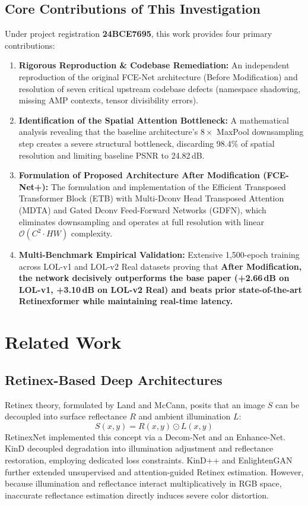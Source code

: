 \documentclass[10pt,twocolumn,letterpaper]{article}
\begin{document}
\subsection{Core Contributions of This Investigation}
Under project registration \textbf{24BCE7695}, this work provides four primary contributions:
\begin{enumerate}
    \item \textbf{Rigorous Reproduction \& Codebase Remediation:} An independent reproduction of the original FCE-Net architecture (Before Modification) and resolution of seven critical upstream codebase defects (namespace shadowing, missing AMP contexts, tensor divisibility errors).
    \item \textbf{Identification of the Spatial Attention Bottleneck:} A mathematical analysis revealing that the baseline architecture's $8\times$ MaxPool downsampling step creates a severe structural bottleneck, discarding 98.4\% of spatial resolution and limiting baseline PSNR to 24.82\,dB.
    \item \textbf{Formulation of Proposed Architecture After Modification (FCE-Net+):} The formulation and implementation of the Efficient Transposed Transformer Block (ETB) with Multi-Dconv Head Transposed Attention (MDTA) and Gated Dconv Feed-Forward Networks (GDFN), which eliminates downsampling and operates at full resolution with linear $\mathcal{O}(C^2 \cdot HW)$ complexity.
    \item \textbf{Multi-Benchmark Empirical Validation:} Extensive 1,500-epoch training across LOL-v1 and LOL-v2 Real datasets proving that \textbf{After Modification, the network decisively outperforms the base paper (+2.66\,dB on LOL-v1, +3.10\,dB on LOL-v2 Real) and beats prior state-of-the-art Retinexformer while maintaining real-time latency.}
\end{enumerate}

\section{Related Work}

\subsection{Retinex-Based Deep Architectures}
Retinex theory, formulated by Land and McCann, posits that an image $S$ can be decoupled into surface reflectance $R$ and ambient illumination $L$:
\begin{equation}
S(x, y) = R(x, y) \odot L(x, y)
\end{equation}
RetinexNet \cite{wei2018deep} implemented this concept via a Decom-Net and an Enhance-Net. KinD \cite{zhang2019kindling} decoupled degradation into illumination adjustment and reflectance restoration, employing dedicated loss constraints. KinD++ and EnlightenGAN \cite{jiang2021enlightengan} further extended unsupervised and attention-guided Retinex estimation. However, because illumination and reflectance interact multiplicatively in RGB space, inaccurate reflectance estimation directly induces severe color distortion.
\end{document}
